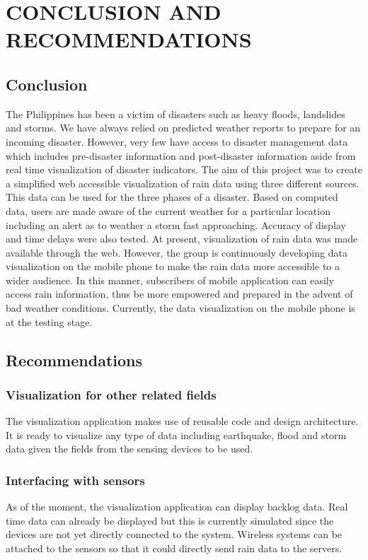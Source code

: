\chapter{CONCLUSION AND RECOMMENDATIONS}

\section{Conclusion}
The Philippines has been a victim of disasters such as heavy floods, landslides and storms.  We have always relied on predicted weather reports to prepare for an incoming disaster. However, very few have access to disaster management data which includes pre-disaster information and post-disaster information aside from real time visualization of disaster indicators. The aim of this project was to create a simplified web accessible visualization of rain data using three different sources.  This data can be used for the three phases of a disaster.  Based on computed data, users are made aware of the current weather for a particular location including an alert as to weather a storm fast approaching.  Accuracy of display and time delays were also tested. At present, visualization of rain data was made available through the web. However, the group is continuously developing data visualization on the mobile phone to make the rain data more accessible to a wider audience. In this manner, subscribers of mobile application can easily access rain information, thus be more empowered and prepared in the advent of bad weather conditions. Currently, the data visualization on the mobile phone is at the testing stage.

\section{Recommendations}

\subsection{Visualization for other related fields}
The visualization application makes use of reusable code and design architecture. It is ready to visualize any type of data including earthquake, flood and storm data given the fields from the sensing devices to be used.

\subsection{Interfacing with sensors}
As of the moment, the visualization application can display backlog data. Real time data can already be displayed but this is currently simulated since the devices are not yet directly connected to the system. Wireless systems can be attached to the sensors so that it could directly send rain data to the servers.

